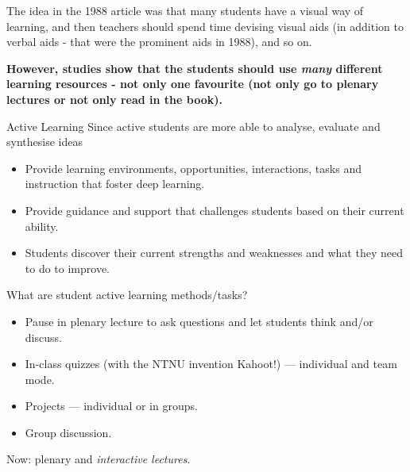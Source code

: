 \documentclass[
  ignorenonframetext,
]{beamer}
\providecommand{\tightlist}{%
  \setlength{\itemsep}{0pt}\setlength{\parskip}{0pt}}
\begin{document}
\begin{frame}
The idea in the 1988 article was that many students have a visual way of
learning, and then teachers should spend time devising visual aids (in
addition to verbal aids - that were the prominent aids in 1988), and so
on.

\textbf{However, studies show that the students should use \emph{many}
different learning resources - not only one favourite (not only go to
plenary lectures or not only read in the book).}
\end{frame}

\begin{frame}{Active Learning}
\protect\hypertarget{active-learning}{}
Since active students are more able to analyse, evaluate and synthesise
ideas

\begin{itemize}
\tightlist
\item
  Provide learning environments, opportunities, interactions, tasks and
  instruction that foster deep learning.
\item
  Provide guidance and support that challenges students based on their
  current ability.
\item
  Students discover their current strengths and weaknesses and what they
  need to do to improve.
\end{itemize}

What are student active learning methods/tasks?

\begin{itemize}
\tightlist
\item
  Pause in plenary lecture to ask questions and let students think
  and/or discuss.
\item
  In-class quizzes (with the NTNU invention Kahoot!) --- individual and
  team mode.
\item
  Projects --- individual or in groups.
\item
  Group discussion.
\end{itemize}

Now: plenary and \emph{interactive lectures}.
\end{frame}
\end{document}
